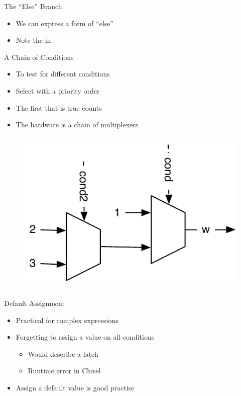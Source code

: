 \begin{frame}[fragile]{The ``Else'' Branch}
\begin{itemize}
\item We can express a form of ``else''
\item Note the  in 
\end{itemize}
\end{frame}



\begin{frame}[fragile]{A Chain of Conditions}
\begin{itemize}
\item To test for different conditions
\item Select with a priority order
\item The first that is true counts
\item The hardware is a chain of multiplexers
\end{itemize}
\begin{columns}
\begin{figure}
  \includegraphics[scale=\scale]{../figures/mux-chain}
\end{figure}
\end{columns}
\end{frame}

\begin{frame}[fragile]{Default Assignment}
\begin{itemize}
\item Practical for complex expressions
\item Forgetting to assign a value on all conditions
\begin{itemize}
\item Would describe a latch
\item Runtime error in Chisel
\end{itemize}
\item Assign a default value is good practise
\end{itemize}
\end{frame}

